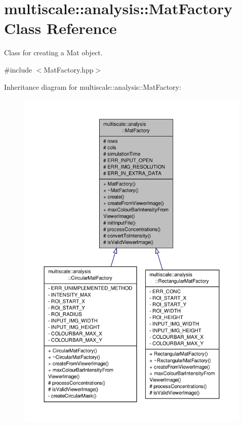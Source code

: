 \hypertarget{classmultiscale_1_1analysis_1_1MatFactory}{\section{multiscale\-:\-:analysis\-:\-:Mat\-Factory Class Reference}
\label{classmultiscale_1_1analysis_1_1MatFactory}
}


Class for creating a Mat object.  




{\ttfamily \#include $<$Mat\-Factory.\-hpp$>$}



Inheritance diagram for multiscale\-:\-:analysis\-:\-:Mat\-Factory\-:
\nopagebreak
\begin{figure}[H]
\begin{center}
\leavevmode
\includegraphics[width=350pt]{classmultiscale_1_1analysis_1_1MatFactory__inherit__graph}
\end{center}
\end{figure}


